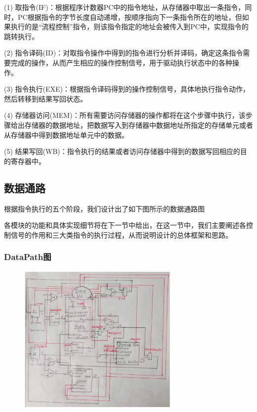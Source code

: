 \documentclass{article}
\begin{document}
(1) 取指令(IF)：根据程序计数器PC中的指令地址，从存储器中取出一条指令，同时，PC根据指令的字节长度自动递增，按顺序指向下一条指令所在的地址，但如果执行的是“流程控制”指令，则该指令指定的地址会被传入到PC中，实现指令的跳转执行。 

(2) 指令译码(ID)：对取指令操作中得到的指令进行分析并译码，确定这条指令需要完成的操作，从而产生相应的操作控制信号，用于驱动执行状态中的各种操作。 

(3) 指令执行(EXE)：根据指令译码得到的操作控制信号，具体地执行指令动作，然后转移到结果写回状态。

(4) 存储器访问(MEM)：所有需要访问存储器的操作都将在这个步骤中执行，该步骤给出存储器的数据地址，把数据写入到存储器中数据地址所指定的存储单元或者从存储器中得到数据地址单元中的数据。 

(5) 结果写回(WB)：指令执行的结果或者访问存储器中得到的数据写回相应的目的寄存器中。

\subsection{数据通路}
根据指令执行的五个阶段，我们设计出了如下图所示的数据通路图

各模块的功能和具体实现细节将在下一节中给出，在这一节中，我们主要阐述各控制信号的作用和三大类指令的执行过程，从而说明设计的总体框架和思路。
\subsubsection{DataPath图}
\begin{figure}[H]
    \centering
    \includegraphics[width=0.7\textwidth]{pic/8.png}
    \end{figure}
\end{document}
